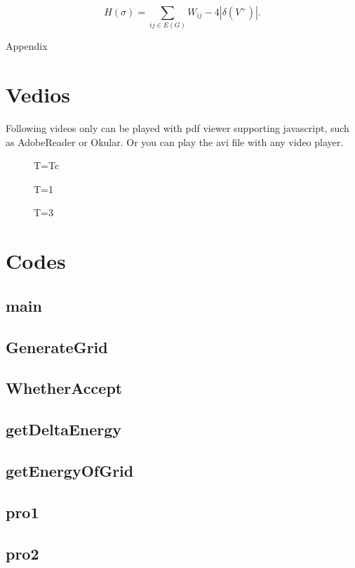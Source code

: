 \documentclass[11pt,openany]{book}              %
\begin{document}
\begin{equation}
  H(\sigma )=\sum _{ij\in E(G)}W_{ij}-4\left|\delta (V^{+})\right|.
\end{equation}
%
%
\appendix
\begin{center}
  \large Appendix
\end{center}
\section{Vedios}
Following videos only can be played with pdf viewer supporting javascript, such as AdobeReader or Okular. Or you can play the avi file with any video player.
\begin{figure}[H]
  \centering
  \caption{T=Tc}
  \label{vid:Tc}
\end{figure}
\begin{figure}[H]
  \centering
  \caption{T=1}
  \label{vid:1}
\end{figure}
\begin{figure}[H]
  \centering
  \caption{T=3}
  \label{vid:3}
\end{figure}
\section{Codes}
\newcommand{\code}[1]{
\subsection{#1}}
\code{main}
\code{GenerateGrid}
\code{WhetherAccept}
\code{getDeltaEnergy}
\code{getEnergyOfGrid}
\code{pro1}
\code{pro2}
\end{document}
